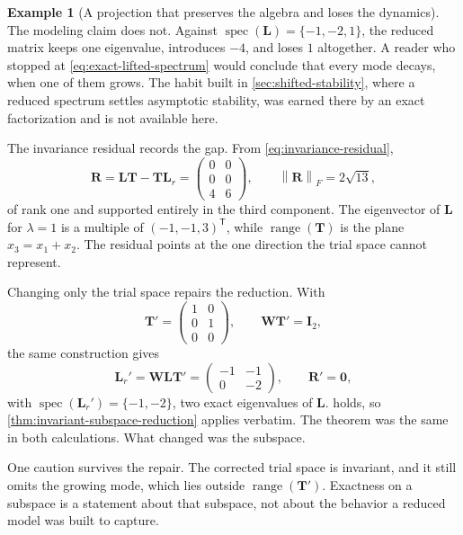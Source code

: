 \documentclass[11pt]{article}
\newcommand{\I}{\mathbf{I}}
\newcommand{\mat}[1]{\mathbf{#1}}
\newcommand{\range}{\operatorname{range}}
\newcommand{\spec}{\operatorname{spec}}
\newcommand{\norm}[1]{\left\lVert #1\right\rVert}
\theoremstyle{definition}
\newtheorem{example}[example]{Example}
\theoremstyle{remark}
\begin{document}
\begin{example}[A projection that preserves the algebra and loses the dynamics]
The modeling claim does not. Against \(\spec(\mat{L})=\{-1,-2,1\}\), the reduced matrix keeps one eigenvalue, introduces \(-4\), and loses \(1\) altogether. A reader who stopped at \cref{eq:exact-lifted-spectrum} would conclude that every mode decays, when one of them grows. The habit built in \cref{sec:shifted-stability}, where a reduced spectrum settles asymptotic stability, was earned there by an exact factorization and is not available here.

The invariance residual records the gap. From \cref{eq:invariance-residual},
\begin{equation}
  \mat{R}
  =\mat{L}\mat{T}-\mat{T}\mat{L}_r
  =
  \begin{pmatrix}
    0&0\\
    0&0\\
    4&6
  \end{pmatrix},
  \qquad
  \norm{\mat{R}}_{F}=2\sqrt{13},
  \label{eq:projection-example-residual}
\end{equation}
of rank one and supported entirely in the third component. The eigenvector of \(\mat{L}\) for \(\lambda=1\) is a multiple of \((-1,-1,3)^{\mathsf T}\), while \(\range(\mat{T})\) is the plane \(x_3=x_1+x_2\). The residual points at the one direction the trial space cannot represent.

Changing only the trial space repairs the reduction. With
\[
  \mat{T}'=
  \begin{pmatrix}
    1&0\\
    0&1\\
    0&0
  \end{pmatrix},
  \qquad
  \mat{W}\mat{T}'=\I_2,
\]
the same construction gives
\begin{equation}
  \mat{L}_r'
  =\mat{W}\mat{L}\mat{T}'
  =
  \begin{pmatrix}
    -1&-1\\
     0&-2
  \end{pmatrix},
  \qquad
  \mat{R}'=\mat{0},
  \label{eq:projection-example-good}
\end{equation}
with \(\spec(\mat{L}_r')=\{-1,-2\}\), two exact eigenvalues of \(\mat{L}\).  holds, so \cref{thm:invariant-subspace-reduction} applies verbatim. The theorem was the same in both calculations. What changed was the subspace.

One caution survives the repair. The corrected trial space is invariant, and it still omits the growing mode, which lies outside \(\range(\mat{T}')\). Exactness on a subspace is a statement about that subspace, not about the behavior a reduced model was built to capture.
\end{example}
\end{document}
